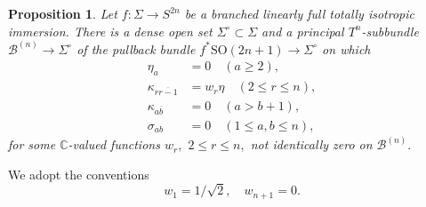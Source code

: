 \documentclass[11pt]{article}
\newtheorem{prop}[theorem]{Proposition}
\theoremstyle{definition}
\newcommand{\C}{\mathbb{C}}
\newcommand{\SO}{\mathrm{SO}}
\numberwithin{equation}{section}
\begin{document}
\begin{prop}\label{prop:frameadapt}
	Let $f : \Sigma \to S^{2n}$ be a branched linearly full totally isotropic immersion. There is a dense open set $\Sigma^{\circ} \subset \Sigma$ and a principal $T^n$-subbundle $\mathcal{B}^{(n)} \to \Sigma^\circ$ of the pullback bundle $f^* \SO(2n+1) \to \Sigma^\circ$ on which
	\begin{equation*}
		\begin{aligned}
			\eta_a                    & = 0 \quad (a \geq 2),               \\
			\kappa_{r \overline{r-1}} & = w_r \eta \quad (2 \leq r \leq n), \\
			\kappa_{a \overline{b}}   & = 0 \quad (a > b +1),               \\
			\sigma_{ab}               & = 0 \quad (1 \leq a,b \leq n),      
		\end{aligned}
	\end{equation*}
	for some $\C$-valued functions $w_r,$ $2 \leq r \leq n,$ not identically zero on $\mathcal{B}^{(n)}.$
\end{prop}

We adopt the conventions
\begin{equation*}
	w_1 = 1/\sqrt{2}, \quad w_{n+1} = 0.
\end{equation*}
\end{document}
